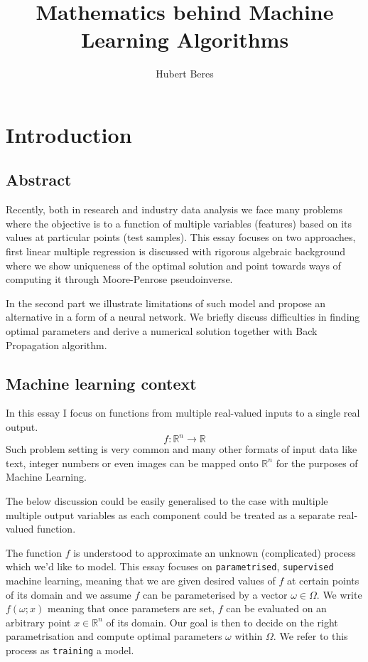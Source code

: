 \documentclass[a4paper]{article}
\title{Mathematics behind Machine Learning Algorithms}
\author{Hubert Beres}
\theoremstyle{break}
\newcommand{\R}{\mathbb{R}}
\begin{document}
\maketitle

\section{Introduction}

\subsection{Abstract}

Recently, both in research and industry data analysis we face many problems where the objective is to  a function of multiple variables (features) based on its values at particular points (test samples). This essay focuses on two approaches, first linear multiple regression is discussed with rigorous algebraic background where we show uniqueness of the optimal solution and point towards ways of computing it through Moore-Penrose pseudoinverse.

In the second part we illustrate limitations of such model and propose an alternative in a form of a neural network. We briefly discuss difficulties in finding optimal parameters and derive a numerical solution together with Back Propagation algorithm.

\subsection{Machine learning context}

In this essay I focus on functions from multiple real-valued inputs to a single real output.
$$ f : \R^n \to \R $$
Such problem setting is very common and many other formats of input data like text, integer numbers or even images can be mapped onto $\R^n$ for the purposes of Machine Learning.

The below discussion could be easily generalised to the case with multiple multiple output variables as each component could be treated as a separate real-valued function.

The function $f$ is understood to approximate an unknown (complicated) process which we'd like to model. This essay focuses on {\tt parametrised}, {\tt supervised} machine learning, meaning that we are given desired values of $f$ at certain points of its domain and we assume $f$ can be parameterised by a vector $ \omega \in \Omega$. We write $ f(\omega; x) $ meaning that once parameters are set, $f$ can be evaluated on an arbitrary point $x \in \R^n$ of its domain. Our goal is then to decide on the right parametrisation and compute optimal parameters $\omega$ within $\Omega$. We refer to this process as {\tt training} a model.
\end{document}
